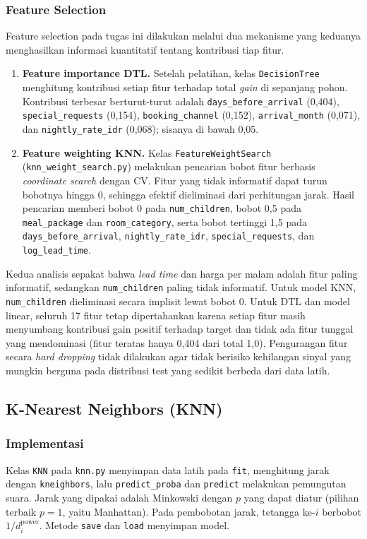 \documentclass[12pt,a4paper]{article}
\begin{document}
\subsubsection{Feature Selection}
Feature selection pada tugas ini dilakukan melalui dua mekanisme yang keduanya menghasilkan informasi kuantitatif tentang kontribusi tiap fitur.

\begin{enumerate}
\item \textbf{Feature importance DTL.} Setelah pelatihan, kelas \texttt{DecisionTree} menghitung kontribusi setiap fitur terhadap total \textit{gain} di sepanjang pohon. Kontribusi terbesar berturut-turut adalah \texttt{days\_before\_arrival} (0,404), \texttt{special\_requests} (0,154), \texttt{booking\_channel} (0,152), \texttt{arrival\_month} (0,071), dan \texttt{nightly\_rate\_idr} (0,068); sisanya di bawah 0,05.
\item \textbf{Feature weighting KNN.} Kelas \texttt{FeatureWeightSearch} (\texttt{knn\_weight\_search.py}) melakukan pencarian bobot fitur berbasis \textit{coordinate search} dengan CV. Fitur yang tidak informatif dapat turun bobotnya hingga 0, sehingga efektif dieliminasi dari perhitungan jarak. Hasil pencarian memberi bobot 0 pada \texttt{num\_children}, bobot 0,5 pada \texttt{meal\_package} dan \texttt{room\_category}, serta bobot tertinggi 1,5 pada \texttt{days\_before\_arrival}, \texttt{nightly\_rate\_idr}, \texttt{special\_requests}, dan \texttt{log\_lead\_time}.
\end{enumerate}

Kedua analisis sepakat bahwa \textit{lead time} dan harga per malam adalah fitur paling informatif, sedangkan \texttt{num\_children} paling tidak informatif. Untuk model KNN, \texttt{num\_children} dieliminasi secara implisit lewat bobot 0. Untuk DTL dan model linear, seluruh 17 fitur tetap dipertahankan karena setiap fitur masih menyumbang kontribusi gain positif terhadap target dan tidak ada fitur tunggal yang mendominasi (fitur teratas hanya 0,404 dari total 1,0). Pengurangan fitur secara \textit{hard dropping} tidak dilakukan agar tidak berisiko kehilangan sinyal yang mungkin berguna pada distribusi test yang sedikit berbeda dari data latih.

\subsection{K-Nearest Neighbors (KNN)}\label{sec:knn}
\subsubsection{Implementasi}
Kelas \texttt{KNN} pada \texttt{knn.py} menyimpan data latih pada \texttt{fit}, menghitung jarak dengan \texttt{kneighbors}, lalu \texttt{predict\_proba} dan \texttt{predict} melakukan pemungutan suara. Jarak yang dipakai adalah Minkowski dengan $p$ yang dapat diatur (pilihan terbaik $p=1$, yaitu Manhattan). Pada pembobotan jarak, tetangga ke-$i$ berbobot $1/d_i^{\text{power}}$. Metode \texttt{save} dan \texttt{load} menyimpan model.
\end{document}
